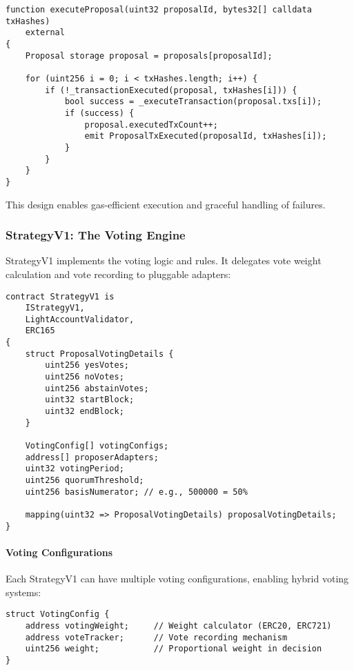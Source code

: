 \documentclass[11pt,a4paper]{article}
\begin{document}
\begin{lstlisting}[caption=Partial Execution Logic]
function executeProposal(uint32 proposalId, bytes32[] calldata txHashes)
    external
{
    Proposal storage proposal = proposals[proposalId];

    for (uint256 i = 0; i < txHashes.length; i++) {
        if (!_transactionExecuted(proposal, txHashes[i])) {
            bool success = _executeTransaction(proposal.txs[i]);
            if (success) {
                proposal.executedTxCount++;
                emit ProposalTxExecuted(proposalId, txHashes[i]);
            }
        }
    }
}
\end{lstlisting}

This design enables gas-efficient execution and graceful handling of failures.

\subsubsection{StrategyV1: The Voting Engine}

StrategyV1 implements the voting logic and rules. It delegates vote weight calculation and vote recording to pluggable adapters:

\begin{lstlisting}[caption=StrategyV1 Architecture]
contract StrategyV1 is
    IStrategyV1,
    LightAccountValidator,
    ERC165
{
    struct ProposalVotingDetails {
        uint256 yesVotes;
        uint256 noVotes;
        uint256 abstainVotes;
        uint32 startBlock;
        uint32 endBlock;
    }

    VotingConfig[] votingConfigs;
    address[] proposerAdapters;
    uint32 votingPeriod;
    uint256 quorumThreshold;
    uint256 basisNumerator; // e.g., 500000 = 50%

    mapping(uint32 => ProposalVotingDetails) proposalVotingDetails;
}
\end{lstlisting}

\paragraph{Voting Configurations}

Each StrategyV1 can have multiple voting configurations, enabling hybrid voting systems:

\begin{lstlisting}[caption=Voting Configuration Structure]
struct VotingConfig {
    address votingWeight;     // Weight calculator (ERC20, ERC721)
    address voteTracker;      // Vote recording mechanism
    uint256 weight;           // Proportional weight in decision
}
\end{lstlisting}
\end{document}
